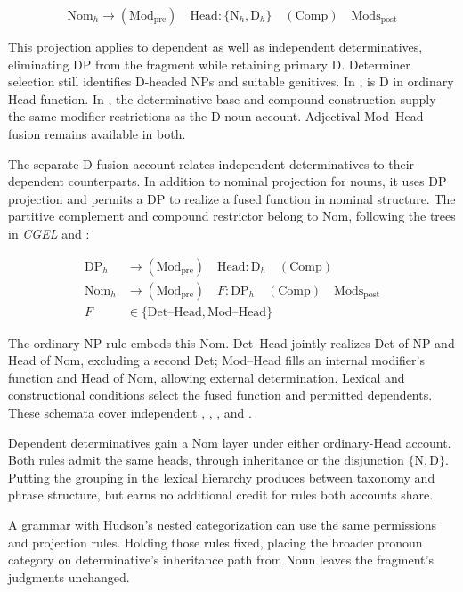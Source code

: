 \documentclass[12pt]{article}
\begin{document}
\[
\mathrm{Nom}_{h}\to(\mathrm{Mod}_{\mathrm{pre}})\quad\mathrm{Head}:\{\mathrm{N}_{h},\mathrm{D}_{h}\}\quad(\mathrm{Comp})\quad\mathrm{Mods}_{\mathrm{post}}
\]

This projection applies to dependent as well as independent determinatives, eliminating DP from the fragment while retaining primary D. Determiner selection still identifies D-headed NPs and suitable genitives. In ,  is D in ordinary Head function. In , the determinative base and compound construction supply the same modifier restrictions as the D-noun account. Adjectival Mod--Head fusion remains available in both.

The separate-D fusion account relates independent determinatives to their dependent counterparts. In addition to nominal projection for nouns, it uses DP projection and permits a DP to realize a fused function in nominal structure. The partitive complement and compound restrictor belong to Nom, following the trees in \textit{CGEL} and \textcite[582]{Payne2007}:

\[
\begin{aligned}
\mathrm{DP}_{h} &\to (\mathrm{Mod}_{\mathrm{pre}})\quad \mathrm{Head}:\mathrm{D}_{h}\quad (\mathrm{Comp}) \\
\mathrm{Nom}_{h} &\to (\mathrm{Mod}_{\mathrm{pre}})\quad F:\mathrm{DP}_{h}\quad (\mathrm{Comp})\quad \mathrm{Mods}_{\mathrm{post}} \\
F&\in\{\mathrm{Det\text{--}Head},\mathrm{Mod\text{--}Head}\}
\end{aligned}
\]

The ordinary NP rule embeds this Nom. Det--Head jointly realizes Det of NP and Head of Nom, excluding a second Det; Mod--Head fills an internal modifier's function and Head of Nom, allowing external determination. Lexical and constructional conditions select the fused function and permitted dependents. These schemata cover independent , , , and .

Dependent determinatives gain a Nom layer under either ordinary-Head account. Both rules admit the same heads, through inheritance or the disjunction $\{\mathrm{N},\mathrm{D}\}$. Putting the grouping in the lexical hierarchy produces  between taxonomy and phrase structure, but earns no additional credit for rules both accounts share.

A grammar with Hudson's nested categorization can use the same permissions and projection rules. Holding those rules fixed, placing the broader pronoun category on determinative's inheritance path from Noun leaves the fragment's judgments unchanged.
\end{document}
